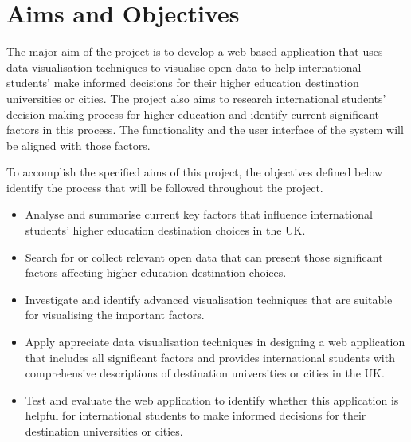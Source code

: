 \section{Aims and Objectives 
}

The major aim of the project is to develop a web-based application that uses data visualisation techniques to visualise open data to help international students’ make informed decisions for their higher education destination universities or cities. The project also aims to research international students’ decision-making process for higher education and identify current significant factors in this process. The functionality and the user interface of the system will be aligned with those factors.

To accomplish the specified aims of this project, the objectives defined below identify the process that will be followed throughout the project.
\begin{itemize}


	\item Analyse and summarise current key factors that influence international students’ higher education destination choices in the UK.
 
	\item Search for or collect relevant open data that can present those significant factors affecting higher education destination choices.
  
	\item Investigate and identify advanced visualisation techniques that are suitable for visualising the important factors. 

	\item Apply appreciate data visualisation techniques in designing a web application that includes all significant factors and provides international students with comprehensive descriptions of destination universities or cities in the UK.

	\item Test and evaluate the web application to identify whether this application is helpful for international students to make informed decisions for their destination universities or cities.
\end{itemize}

